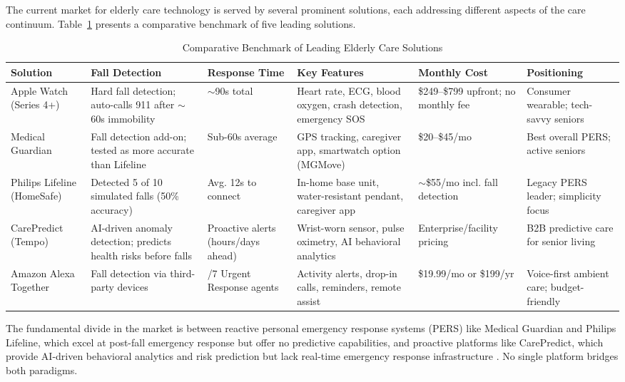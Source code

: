 \documentclass[conference]{IEEEtran}
\begin{document}
The current market for elderly care technology is served by several prominent solutions, each addressing different aspects of the care continuum. Table~\ref{tab:comparison} presents a comparative benchmark of five leading solutions.

\begin{table}[!t]
\caption{Comparative Benchmark of Leading Elderly Care Solutions}
\label{tab:comparison}
\centering
\renewcommand{\arraystretch}{1.3}
\begin{tabularx}{\textwidth}{>{\raggedright\arraybackslash}p{2.2cm} >{\raggedright\arraybackslash}p{3.0cm} >{\raggedright\arraybackslash}p{2.0cm} >{\raggedright\arraybackslash}p{3.5cm} >{\raggedright\arraybackslash}p{2.0cm} >{\raggedright\arraybackslash}p{2.8cm}}
\toprule
\textbf{Solution} & \textbf{Fall Detection} & \textbf{Response Time} & \textbf{Key Features} & \textbf{Monthly Cost} & \textbf{Positioning} \\
\midrule
Apple Watch (Series 4+) & Hard fall detection; auto-calls 911 after $\sim$60s immobility & $\sim$90s total & Heart rate, ECG, blood oxygen, crash detection, emergency SOS & \$249--\$799 upfront; no monthly fee & Consumer wearable; tech-savvy seniors \\
\midrule
Medical Guardian & Fall detection add-on; tested as more accurate than Lifeline & Sub-60s average & GPS tracking, caregiver app, smartwatch option (MGMove) & \$20--\$45/mo & Best overall PERS; active seniors \\
\midrule
Philips Lifeline (HomeSafe) & Detected 5 of 10 simulated falls (50\% accuracy) & Avg. 12s to connect & In-home base unit, water-resistant pendant, caregiver app & $\sim$\$55/mo incl. fall detection & Legacy PERS leader; simplicity focus \\
\midrule
CarePredict (Tempo) & AI-driven anomaly detection; predicts health risks before falls & Proactive alerts (hours/days ahead) & Wrist-worn sensor, pulse oximetry, AI behavioral analytics & Enterprise/facility pricing & B2B predictive care for senior living \\
\midrule
Amazon Alexa Together & Fall detection via third-party devices & 24/7 Urgent Response agents & Activity alerts, drop-in calls, reminders, remote assist & \$19.99/mo or \$199/yr & Voice-first ambient care; budget-friendly \\
\bottomrule
\end{tabularx}
\end{table}

The fundamental divide in the market is between reactive personal emergency response systems (PERS) like Medical Guardian and Philips Lifeline, which excel at post-fall emergency response but offer no predictive capabilities, and proactive platforms like CarePredict, which provide AI-driven behavioral analytics and risk prediction but lack real-time emergency response infrastructure \cite{hfs2024}. No single platform bridges both paradigms.
\end{document}
